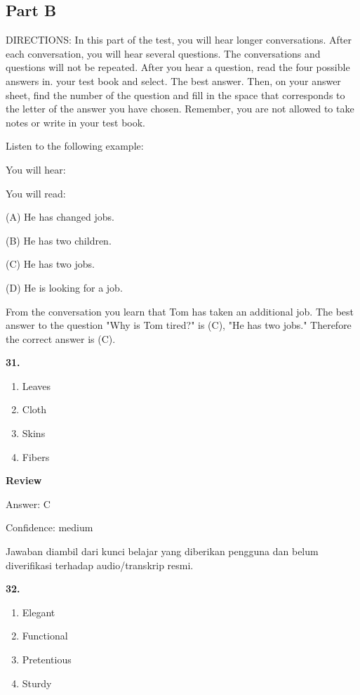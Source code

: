 \documentclass[12pt]{article}
\begin{document}
\subsection*{Part B}
DIRECTIONS: In this part of the test, you will hear longer conversations. After each conversation, you will hear several questions. The conversations and questions will not be repeated. After you hear a question, read the four possible answers in. your test book and select. The best answer. Then, on your answer sheet, find the number of the question and fill in the space that corresponds to the letter of the answer you have chosen. Remember, you are not allowed to take notes or write in your test book.\par
\begin{exampleblock}
Listen to the following example:\par
You will hear:\par
You will read:\par
(A) He has changed jobs.\par
(B) He has two children.\par
(C) He has two jobs.\par
(D) He is looking for a job.\par
From the conversation you learn that Tom has taken an additional job. The best answer to the question "Why is Tom tired?" is (C), "He has two jobs." Therefore the correct answer is (C).\par
\end{exampleblock}
\noindent\textbf{31.}
\begin{enumerate}[label=(\Alph*),leftmargin=*,itemsep=0.2em]
\item Leaves
\item Cloth
\item Skins
\item Fibers
\end{enumerate}
\par
\begingroup
\setlength{\parskip}{0pt}
\setlength{\parindent}{0pt}
\textbf{Review}\par
Answer: C\par
Confidence: medium\par
Jawaban diambil dari kunci belajar yang diberikan pengguna dan belum diverifikasi terhadap audio/transkrip resmi.\par
\endgroup
\par
\vspace{0.25\baselineskip}
\noindent\textbf{32.}
\begin{enumerate}[label=(\Alph*),leftmargin=*,itemsep=0.2em]
\item Elegant
\item Functional
\item Pretentious
\item Sturdy
\end{enumerate}
\end{document}
